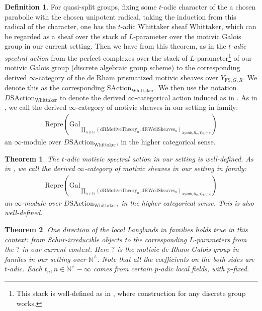 \documentclass[12pt]{article}
\newtheorem{theorem}{Theorem}
\theoremstyle{definition}
\newtheorem{definition}{Definition}
\begin{document}
\begin{definition}
For quasi-split groups, fixing some $t$-adic character of the a chosen parabolic with the chosen unipotent radical, taking the induction from this radical of the character, one has the $t$-adic Whittaker sheaf $\mathrm{Whittaker}$, which can be regarded as a sheaf over the stack of $L$-parameter over the motivic Galois group in our current setting. Then we have from this theorem, as in \cite{1FS} the \textit{$t$-adic spectral action} from the perfect complexes over the stack of $L$-parameter\footnote{This stack is well-defined as in \cite{1FS}, where construction for any discrete group works.} of our motivic Galois group (discrete algebraic group scheme) to the corresponding derived $\infty$-category of the de Rham prismatized motivic sheaves over $Y_{\mathrm{FS},G,R}$. We denote this as the corresponding $\mathrm{SAction}_{\mathrm{Whittaker}}$. We then use the notation $D\mathrm{SAction}_{\mathrm{Whittaker}}$ to denote the derived $\infty$-categorical action induced as in \cite{HJ}. As in \cite{HJ}, we call the derived $\infty$-category of motivic sheaves in our setting in family:
\begin{align}
\mathrm{Repre}(\mathrm{Gal}_{\widetilde{\prod_{n\in \mathbb{N}} (\mathrm{dRMotiveTheory}_{n}, \mathrm{dRWeilSheaves}_n)_{\mathrm{Ayoub}, R_n,Y_{\mathrm{FS},G,R}}}})
\end{align}
an $\infty$-module over $D\mathrm{SAction}_{\mathrm{Whittaker}}$, in the higher categorical sense.
\end{definition}


\begin{theorem}
The $t$-adic motivic spectral action in our setting is well-defined. As in \cite{HJ}, we call the derived $\infty$-category of motivic sheaves in our setting in family:
\begin{align}
\mathrm{Repre}(\mathrm{Gal}_{\widetilde{\prod_{n\in \mathbb{N}} (\mathrm{dRMotiveTheory}_{n}, \mathrm{dRWeilSheaves}_n)_{\mathrm{Ayoub}, R_n,Y_{\mathrm{FS},G,R}}}})
\end{align}
an $\infty$-module over $D\mathrm{SAction}_{\mathrm{Whittaker}}$, in the higher categorical sense. This is also well-defined.
\end{theorem}



\begin{theorem}
One direction of the local Langlands in families holds true in this context: from Schur-irreducible objects to the corresponding $L$-parameters from the $?$ in our current context. Here $?$ is the motivic de Rham Galois group in familes in our setting over $\mathbb{N}^\wedge$. Note that all the coefficients on the both sides are $t$-adic. Each $t_n,n\in\mathbb{N}^\wedge-{\infty}$ comes from certain $p$-adic local fields, with $p$-fixed. 
\end{theorem}
\end{document}
